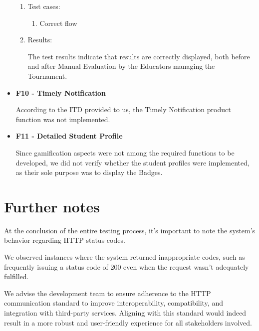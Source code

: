 \documentclass{Configuration_Files/Template}
\begin{document}
\begin{itemize}
\begin{enumerate}
        \item Test cases:
        
        \begin{enumerate}
        
            \item Correct flow
    
        \end{enumerate}
        
        \item Results:
        
        The test results indicate that results are correctly displayed, both before and after Manual Evaluation by the Educators managing the Tournament.\\
    
    \end{enumerate}

    
    \item \textbf{F10 - Timely Notification}
    
    According to the ITD provided to us, the Timely Notification product function was not implemented.\\

    \item \textbf{F11 - Detailed Student Profile}

    Since gamification aspects were not among the required functions to be developed, we did not verify whether the student profiles were implemented, as their sole purpose was to display the Badges.\\

\end{itemize}

\section{Further notes}

At the conclusion of the entire testing process, it's important to note the system's behavior regarding HTTP status codes.

We observed instances where the system returned inappropriate codes, such as frequently issuing a status code of 200 even when the request wasn't adequately fulfilled.

We advise the development team to ensure adherence to the HTTP communication standard to improve interoperability, compatibility, and integration with third-party services. Aligning with this standard would indeed result in a more robust and user-friendly experience for all stakeholders involved.
\end{document}
